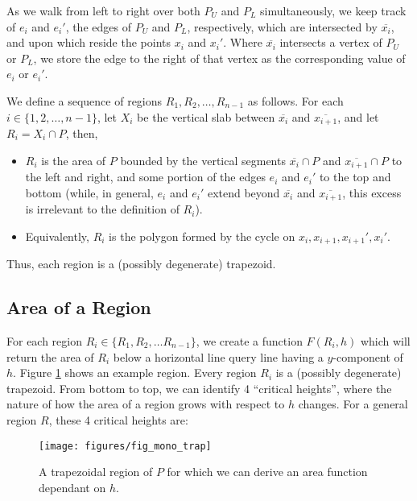 As we walk from left to right over both $P_U$ and $P_L$ simultaneously, we keep track of $e_i$ and $e_i'$, the edges of $P_U$ and $P_L$, respectively, which are intersected by $\overline{x_i}$, and upon which reside the points $x_i$ and $x_i'$. Where $\overline{x_i}$ intersects a vertex of $P_U$ or $P_L$, 
we store the edge to the right of that vertex as the corresponding value of $e_i$ or $e_i'$.

We define a sequence of regions $R_1, R_2, \dots, R_{n-1}$ as follows. For each $i \in \{1, 2, \ldots, n-1\}$, let $X_i$ be the vertical slab between $\overline{x_i}$ and $\overline{x_{i+1}}$, and let $R_i = X_i \cap P$, then,

\begin{itemize}
 \item $R_i$ is the area of $P$ bounded by the vertical segments $\overline{x_i} \cap P$ and $\overline{x_{i+1}} \cap P$ to the left and right, and some portion of the edges $e_i$ and $e_i'$ to the top and bottom (while, in general, $e_i$ and  $e_i'$ extend beyond $\overline{x_i}$ and $\overline{x_{i+1}}$, this excess is irrelevant to the definition of $R_i$).
 
 \item Equivalently, $R_i$ is the polygon formed by the cycle on $x_i, x_{i+1}, x_{i+1}', x_i'$.
\end{itemize}

\noindent
Thus, each region is a (possibly degenerate) trapezoid.


\subsection{Area of a Region}
\label{sec:region_area}

For each region $R_i \in \{R_1, R_2, \ldots R_{n-1}\}$, we create a function $F(R_i, h)$ which will return the area of $R_i$ below a horizontal line query line having a $y$-component of $h$. Figure \ref{fig:monotonep:trapezoid} shows an example region. Every region $R_i$ is a (possibly degenerate) trapezoid. From bottom to top, we can identify 4 ``critical heights'', where the nature of how the area of a region grows with respect to $h$ changes.  For a general region $R$, these 4 critical heights are:

\begin{figure}[t]
\begin{center}
  \texttt{[image: figures/fig\_mono\_trap]}
  \caption[A trapezoidal region of $P$.]{A trapezoidal region of $P$ for which we can derive an area function dependant on $h$.}
  \label{fig:monotonep:trapezoid}
\end{center}
\end{figure}

